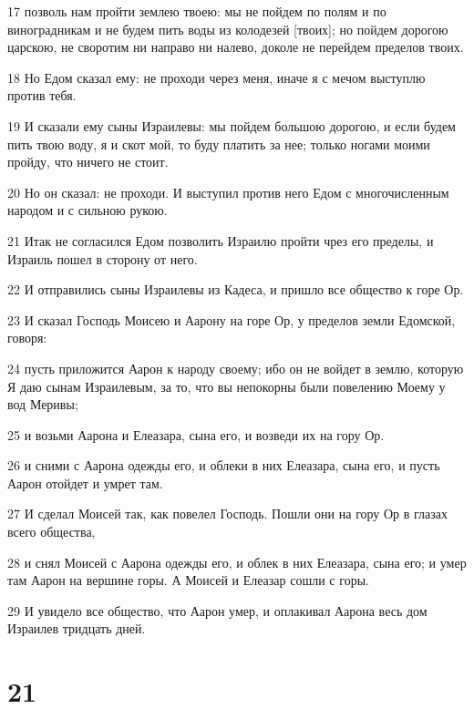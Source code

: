 \par 17 позволь нам пройти землею твоею: мы не пойдем по полям и по виноградникам и не будем пить воды из колодезей [твоих]; но пойдем дорогою царскою, не своротим ни направо ни налево, доколе не перейдем пределов твоих.
\par 18 Но Едом сказал ему: не проходи через меня, иначе я с мечом выступлю против тебя.
\par 19 И сказали ему сыны Израилевы: мы пойдем большою дорогою, и если будем пить твою воду, я и скот мой, то буду платить за нее; только ногами моими пройду, что ничего не стоит.
\par 20 Но он сказал: не проходи. И выступил против него Едом с многочисленным народом и с сильною рукою.
\par 21 Итак не согласился Едом позволить Израилю пройти чрез его пределы, и Израиль пошел в сторону от него.
\par 22 И отправились сыны Израилевы из Кадеса, и пришло все общество к горе Ор.
\par 23 И сказал Господь Моисею и Аарону на горе Ор, у пределов земли Едомской, говоря:
\par 24 пусть приложится Аарон к народу своему; ибо он не войдет в землю, которую Я даю сынам Израилевым, за то, что вы непокорны были повелению Моему у вод Меривы;
\par 25 и возьми Аарона и Елеазара, сына его, и возведи их на гору Ор.
\par 26 и сними с Аарона одежды его, и облеки в них Елеазара, сына его, и пусть Аарон отойдет и умрет там.
\par 27 И сделал Моисей так, как повелел Господь. Пошли они на гору Ор в глазах всего общества,
\par 28 и снял Моисей с Аарона одежды его, и облек в них Елеазара, сына его; и умер там Аарон на вершине горы. А Моисей и Елеазар сошли с горы.
\par 29 И увидело все общество, что Аарон умер, и оплакивал Аарона весь дом Израилев тридцать дней.

\chapter{21}

